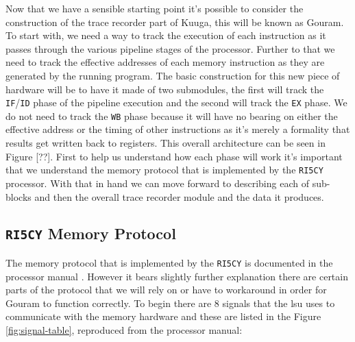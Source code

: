 Now that we have a sensible starting point it's possible to consider the construction of the trace recorder part of Kuuga, this will be known as Gouram. To start with, we need a way to track the execution of each instruction as it passes through the various pipeline stages of the processor. Further to that we need to track the effective addresses of each memory instruction as they are generated by the running program. The basic construction for this new piece of hardware will be to have it made of two submodules, the first will track the \texttt{IF}/\texttt{ID} phase of the pipeline execution and the second will track the \texttt{EX} phase. We do not need to track the \texttt{WB} phase because it will have no bearing on either the effective address or the timing of other instructions as it's merely a formality that results get written back to registers. This overall architecture can be seen in Figure [??]. First to help us understand how each phase will work it's important that we understand the memory protocol that is implemented by the \texttt{RI5CY} processor. With that in hand we can move forward to describing each of sub-blocks and then the overall trace recorder module and the data it produces.


\subsection{\texttt{RI5CY} Memory Protocol}

The memory protocol that is implemented by the \texttt{RI5CY} is documented in the processor manual \cite{andreastraberRI5CYUserManual2017}. However it bears slightly further explanation there are certain parts of the protocol that we will rely on or have to workaround in order for Gouram to function correctly. To begin there are 8 signals that the \gls{lsu} uses to communicate with the memory hardware and these are listed in the Figure \ref{fig:signal-table}, reproduced from the processor manual:

